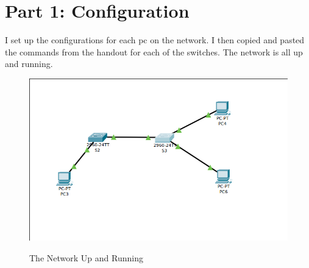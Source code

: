 \documentclass{report}
\title{\classinfo}
\author{\semester}
\date{\today}
\newcommand{\mysection}[1]{\section*{#1}}
\begin{document}
\maketitle

\mysection{\textbf{Part 1: Configuration}}

I set up the configurations for each pc on the network. I then copied and
pasted the commands from the handout for each of the switches.
The network is all up and running.

\begin{figure}[!h]
  \centering
  {\label{run13}\includegraphics[width=.45\linewidth]{Figures/2020-03-08-183211_671x421_scrot.png}}
  \caption{The Network Up and Running}
\end{figure}


\end{document}
